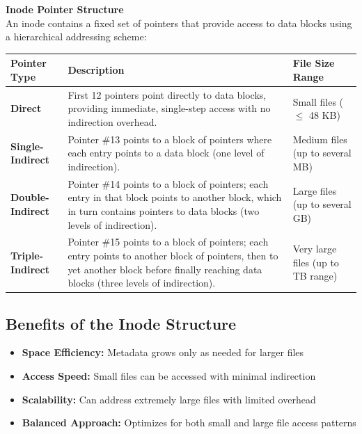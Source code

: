 \begin{center}
  \textbf{Inode Pointer Structure}\\[0.5em]
  An inode contains a fixed set of pointers that provide access to data blocks using a hierarchical addressing scheme:
  
  \begin{tabularx}{\textwidth}{|C{0.23\textwidth}|X|C{0.23\textwidth}|}
    \hline
    \textbf{Pointer Type} & \textbf{Description} & \textbf{File Size Range} \\
    \hline
    \textbf{Direct} & 
    First 12 pointers point directly to data blocks, providing immediate, single-step access with no indirection overhead. 
    & Small files ($\leq$ 48 KB) \\
    \hline
    \textbf{Single-Indirect} & 
    Pointer \#13 points to a block of pointers where each entry points to a data block (one level of indirection). 
    & Medium files (up to several MB) \\
    \hline
    \textbf{Double-Indirect} & 
    Pointer \#14 points to a block of pointers; each entry in that block points to another block, which in turn contains pointers to data blocks (two levels of indirection). 
    & Large files (up to several GB) \\
    \hline
    \textbf{Triple-Indirect} & 
    Pointer \#15 points to a block of pointers; each entry points to another block of pointers, then to yet another block before finally reaching data blocks (three levels of indirection). 
    & Very large files (up to TB range) \\
    \hline
    \end{tabularx}
\end{center}

\subsection{Benefits of the Inode Structure}
\begin{itemize}
  \item \textbf{Space Efficiency:} Metadata grows only as needed for larger files
  \item \textbf{Access Speed:} Small files can be accessed with minimal indirection
  \item \textbf{Scalability:} Can address extremely large files with limited overhead
  \item \textbf{Balanced Approach:} Optimizes for both small and large file access patterns
\end{itemize}



